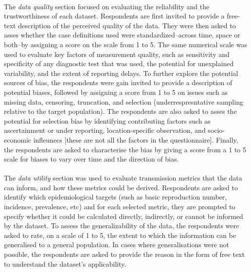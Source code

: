 \documentclass{article}
\begin{document}
\paragraph{}The \textit{data quality} section focused on evaluating the reliability and the trustworthiness of each dataset. Respondents are first invited to provide a free-text description of the perceived quality of the data. They were then asked to asses whether the case definitions used were standardized--across time, space or both--by assigning a score on the scale from 1 to 5. The same numerical scale was used to evaluate key factors of measurement quality, such as sensitivity and specificity of any diagnostic test that was used, the potential for unexplained variability, and the extent of reporting delays. To further explore the potential sources of bias, the respondents were gain invited to provide a description of potential biases, followed by assigning a score from 1 to 5 on issues such as missing data, censoring, truncation, and selection (underrespresntative sampling relative to the target population). The respondents are also asked to asses the potential for selection bias by identifying contributing factors such as ascertainment or under reporting, location-specific observation, and socio-economic infleunecs [these are not all the factors in the questionnaire]. Finally, the respondents are asked to characterise the bias by giving a score from a 1 to 5 scale for biases to vary over time and the direction of bias. 

\paragraph{} The \textit{data utility} section was used to evaluate transmission metrics that the data can inform, and how these metrics could be derived. Respondents are asked to identify which epidemiological targets (such as basic reproduction number, incidence, prevalence, etc) and for each selected metric, they are prompted to specify whether it could be calculated directly, indirectly, or cannot be informed by the dataset. To assess the generalizability of the data, the respondents were asked to rate, on a scale of 1 to 5, the extent to which the information can be generalised to a general population. In cases where generalisations were not possible, the respondents are asked to provide the reason in the form of free text to understand the dataset's applicability. 
\end{document}
